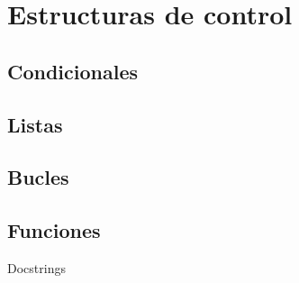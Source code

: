 \chapter{Estructuras de control}

\section{Condicionales}

\section{Listas}

\section{Bucles}

\section{Funciones}
Docstrings